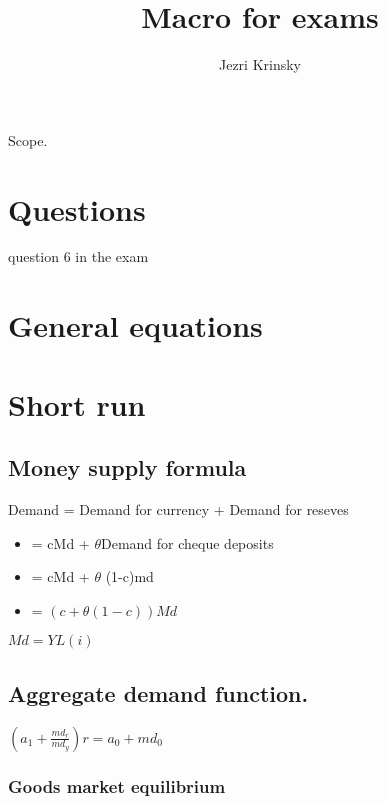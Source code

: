 \documentclass[,twocolumn]{article}
\title{Macro for exams}
\author{Jezri Krinsky}
\date{}
\providecommand{\tightlist}{%
  \setlength{\itemsep}{0pt}\setlength{\parskip}{0pt}}
\begin{document}
\maketitle

Scope.

\hypertarget{questions}{%
\section{Questions}\label{questions}}

question 6 in the exam

\hypertarget{general-equations}{%
\section{General equations}\label{general-equations}}

\hypertarget{short-run}{%
\section{Short run}\label{short-run}}

\hypertarget{money-supply-formula}{%
\subsection{Money supply formula}\label{money-supply-formula}}

Demand = Demand for currency + Demand for reseves

\begin{itemize}
\tightlist
\item
  = cMd + \(\theta\)Demand for cheque deposits
\item
  = cMd + \(\theta\) (1-c)md
\item
  = \((c+\theta(1-c))Md\)
\end{itemize}

\textbf{\(Md = YL(i)\)}

\hypertarget{aggregate-demand-function.}{%
\subsection{Aggregate demand
function.}\label{aggregate-demand-function.}}

\(( a_1 + \frac{md_r}{md_y}) r = a_0 + md_0\)

\hypertarget{goods-market-equilibrium}{%
\subsubsection{Goods market
equilibrium}\label{goods-market-equilibrium}}
\end{document}
